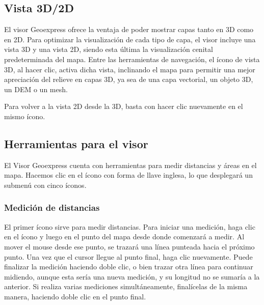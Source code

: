 \documentclass[a4paper,11pt,spanish]{sphinxmanual}
\begin{document}

\sphinxstepscope


\subsection{Vista 3D/2D}
\label{\detokenize{tools/3d-2d:vista-3d-2d}}\label{\detokenize{tools/3d-2d::doc}}
\sphinxAtStartPar
El visor Geoexpress ofrece la ventaja de poder mostrar capas tanto en 3D como en 2D. Para optimizar la visualización de cada tipo de capa, el visor incluye una vista 3D y una vista 2D, siendo esta última la visualización cenital predeterminada del mapa. Entre las herramientas de navegación, el ícono de vista 3D, al hacer clic, activa dicha vista, inclinando el mapa para permitir una mejor apreciación del relieve en capas 3D, ya sea de una capa vectorial, un objeto 3D, un DEM o un mesh.

\sphinxAtStartPar
Para volver a la vista 2D desde la 3D, basta con hacer clic nuevamente en el mismo ícono.

\noindent{}

\sphinxstepscope


\subsection{Herramientas para el visor}
\label{\detokenize{tools/measuring:herramientas-para-el-visor}}\label{\detokenize{tools/measuring::doc}}

\sphinxAtStartPar
El Visor Geoexpress cuenta con herramientas para medir distancias y áreas en el mapa. Hacemos clic en el ícono con forma de llave inglesa, lo que desplegará un submenú con cinco íconos.


\subsubsection{Medición de distancias}
\label{\detokenize{tools/measuring:medicion-de-distancias}}

\sphinxAtStartPar
El primer ícono sirve para medir distancias. Para iniciar una medición, haga clic en el ícono y luego en el punto del mapa desde donde comenzará a medir. Al mover el mouse desde ese punto, se trazará una línea punteada hacia el próximo punto. Una vez que el cursor llegue al punto final, haga clic nuevamente. Puede finalizar la medición haciendo doble clic, o bien trazar otra línea para continuar midiendo, aunque esta sería una nueva medición, y su longitud no se sumaría a la anterior. Si realiza varias mediciones simultáneamente, finalícelas de la misma manera, haciendo doble clic en el punto final.
\end{document}
